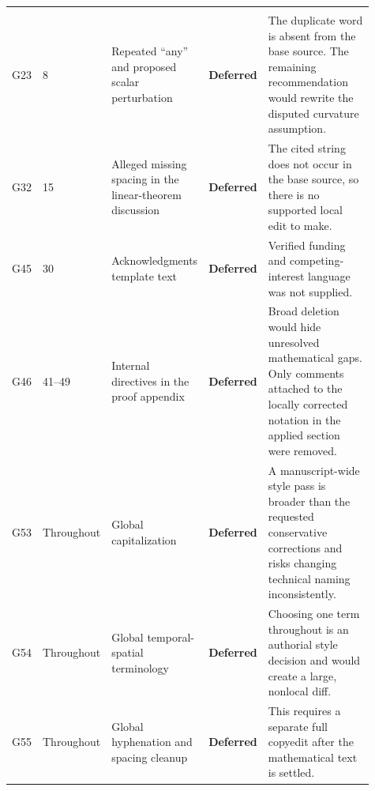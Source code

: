 \documentclass[10pt]{article}
\newcommand{\deferred}{\textcolor{deferredred}{\textbf{Deferred}}}
\begin{document}
\begin{landscape}
\begin{longtable}{L{0.045\linewidth}L{0.08\linewidth}L{0.21\linewidth}L{0.13\linewidth}L{0.445\linewidth}}
\addlinespace
{}\\
\addlinespace
G23 & 8 & Repeated ``any'' and proposed scalar perturbation & \deferred & The
duplicate word is absent from the base source. The remaining recommendation
would rewrite the disputed curvature assumption.\\
G32 & 15 & Alleged missing spacing in the linear-theorem
discussion & \deferred & The cited string does not occur in the base source, so
there is no supported local edit to make.\\
G45 & 30 & Acknowledgments template text & \deferred & Verified funding and
competing-interest language was not supplied.\\
G46 & 41--49 & Internal directives in the proof appendix & \deferred &
Broad deletion would hide unresolved mathematical gaps. Only comments attached
to the locally corrected notation in the applied section were removed.\\
G53 & Throughout & Global capitalization & \deferred & A manuscript-wide style pass is
broader than the requested conservative corrections and risks changing
technical naming inconsistently.\\
G54 & Throughout & Global temporal-spatial terminology & \deferred &
Choosing one term throughout is an authorial style decision and would create a
large, nonlocal diff.\\
G55 & Throughout & Global hyphenation and spacing cleanup & \deferred & This requires a
separate full copyedit after the mathematical text is settled.\\


\end{longtable}
\end{landscape}
\end{document}
